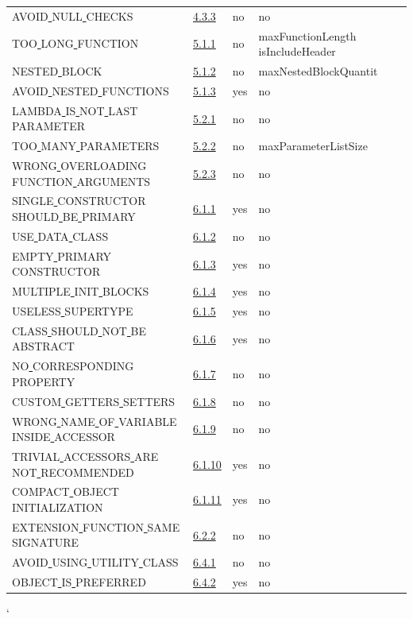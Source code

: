 \begin{longtable}{ |l|p{0.8cm}|p{0.8cm}| p{3cm} | }
AVOID\underline{ }NULL\underline{ }CHECKS & \hyperref[sec:4.3.3]{ 4.3.3} &  no  &   no  \\
TOO\underline{ }LONG\underline{ }FUNCTION & \hyperref[sec:5.1.1]{ 5.1.1} &  no  &   maxFunctionLength isIncludeHeader\\
NESTED\underline{ }BLOCK & \hyperref[sec:5.1.2]{ 5.1.2} &  no  &   maxNestedBlockQuantit\\
AVOID\underline{ }NESTED\underline{ }FUNCTIONS & \hyperref[sec:5.1.3]{ 5.1.3} &  yes  &   no  \\
LAMBDA\underline{ }IS\underline{ }NOT\underline{ }LAST\underline{ }PARAMETER & \hyperref[sec:5.2.1]{ 5.2.1} &  no  &   no \\
TOO\underline{ }MANY\underline{ }PARAMETERS & \hyperref[sec:5.2.2]{ 5.2.2} &  no  &   maxParameterListSize \\
WRONG\underline{ }OVERLOADING\underline{ }FUNCTION\underline{ }ARGUMENTS & \hyperref[sec:5.2.3]{ 5.2.3} &  no  &   no \\
SINGLE\underline{ }CONSTRUCTOR\underline{ }SHOULD\underline{ }BE\underline{ }PRIMARY & \hyperref[sec:6.1.1]{ 6.1.1} &  yes  &   no  \\
USE\underline{ }DATA\underline{ }CLASS & \hyperref[sec:6.1.2]{ 6.1.2} &  no  &   no  \\
EMPTY\underline{ }PRIMARY\underline{ }CONSTRUCTOR & \hyperref[sec:6.1.3]{ 6.1.3} &  yes  &   no  \\
MULTIPLE\underline{ }INIT\underline{ }BLOCKS & \hyperref[sec:6.1.4]{ 6.1.4} &  yes  &   no  \\
USELESS\underline{ }SUPERTYPE & \hyperref[sec:6.1.5]{ 6.1.5} &  yes  &   no  \\
CLASS\underline{ }SHOULD\underline{ }NOT\underline{ }BE\underline{ }ABSTRACT & \hyperref[sec:6.1.6]{ 6.1.6} &  yes  &   no  \\
NO\underline{ }CORRESPONDING\underline{ }PROPERTY & \hyperref[sec:6.1.7]{ 6.1.7} &  no  &   no  \\
CUSTOM\underline{ }GETTERS\underline{ }SETTERS & \hyperref[sec:6.1.8]{ 6.1.8} &  no  &   no  \\
WRONG\underline{ }NAME\underline{ }OF\underline{ }VARIABLE\underline{ }INSIDE\underline{ }ACCESSOR & \hyperref[sec:6.1.9]{ 6.1.9} &  no  &   no \\
TRIVIAL\underline{ }ACCESSORS\underline{ }ARE\underline{ }NOT\underline{ }RECOMMENDED & \hyperref[sec:6.1.10]{ 6.1.10} &  yes  &   no  \\
COMPACT\underline{ }OBJECT\underline{ }INITIALIZATION & \hyperref[sec:6.1.11]{ 6.1.11} &  yes  &   no  \\
EXTENSION\underline{ }FUNCTION\underline{ }SAME\underline{ }SIGNATURE & \hyperref[sec:6.2.2]{ 6.2.2} &  no  &   no  \\
AVOID\underline{ }USING\underline{ }UTILITY\underline{ }CLASS & \hyperref[sec:6.4.1]{ 6.4.1} &  no  &  no \\
OBJECT\underline{ }IS\underline{ }PREFERRED & \hyperref[sec:6.4.2]{ 6.4.2} &  yes  &  no \\
\hline
\end{longtable}
\lstMakeShortInline[basicstyle=\ttfamily\bfseries]`

